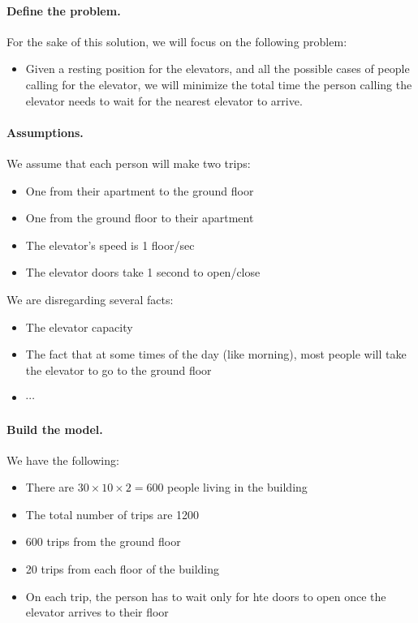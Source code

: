 \begin{enumerate}
\paragraph{Define the problem. } For the sake of this solution, we will focus on the following problem:
\begin{itemize}
	\item Given a resting position for the elevators, and all the possible cases of people calling for the elevator, we will minimize the total time the person calling the elevator needs to wait for the nearest elevator to arrive.
\end{itemize}

\paragraph{Assumptions. } We assume that each person will make two trips:
\begin{itemize}
	\item One from their apartment to the ground floor
	\item One from the ground floor to their apartment
	\item The elevator's speed is 1 floor/sec
	\item The elevator doors take 1 second to open/close
\end{itemize}
 
 We are disregarding several facts:
 \begin{itemize}
 	\item The elevator capacity	
 	\item The fact that at some times of the day (like morning), most people will take the elevator to go to the ground floor
 	\item $\cdots$
 \end{itemize}

\paragraph{Build the model.} We have the following:
\begin{itemize}
	\item There are $30\times10\times2 = 600$ people living in the building
	\item The total number of trips are 1200
	\item 600 trips from the ground floor
	\item 20 trips from each floor of the building
	\item On each trip, the person has to wait only for hte doors to open once the elevator arrives to their floor
\end{itemize}


\end{enumerate}
